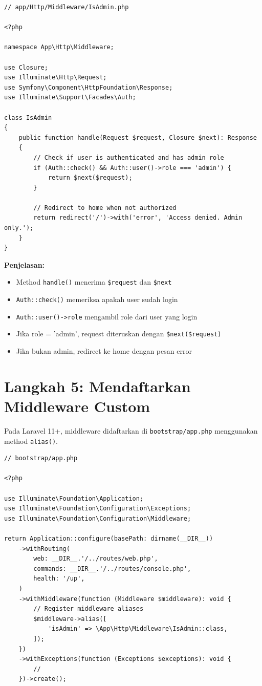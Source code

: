 \documentclass[a4paper,oneside,11pt]{book}
\begin{document}
\begin{lstlisting}[style=phpstyle]
// app/Http/Middleware/IsAdmin.php

<?php

namespace App\Http\Middleware;

use Closure;
use Illuminate\Http\Request;
use Symfony\Component\HttpFoundation\Response;
use Illuminate\Support\Facades\Auth;

class IsAdmin
{
    public function handle(Request $request, Closure $next): Response
    {
        // Check if user is authenticated and has admin role
        if (Auth::check() && Auth::user()->role === 'admin') {
            return $next($request);
        }

        // Redirect to home when not authorized
        return redirect('/')->with('error', 'Access denied. Admin only.');
    }
}
\end{lstlisting}

\textbf{Penjelasan:}
\begin{itemize}
    \item Method \texttt{handle()} menerima \texttt{\$request} dan \texttt{\$next}
    \item \texttt{Auth::check()} memeriksa apakah user sudah login
    \item \texttt{Auth::user()->role} mengambil role dari user yang login
    \item Jika role = 'admin', request diteruskan dengan \texttt{\$next(\$request)}
    \item Jika bukan admin, redirect ke home dengan pesan error
\end{itemize}

\section{Langkah 5: Mendaftarkan Middleware Custom}

Pada Laravel 11+, middleware didaftarkan di \texttt{bootstrap/app.php} menggunakan method \texttt{alias()}.

\begin{lstlisting}[style=phpstyle]
// bootstrap/app.php

<?php

use Illuminate\Foundation\Application;
use Illuminate\Foundation\Configuration\Exceptions;
use Illuminate\Foundation\Configuration\Middleware;

return Application::configure(basePath: dirname(__DIR__))
    ->withRouting(
        web: __DIR__.'/../routes/web.php',
        commands: __DIR__.'/../routes/console.php',
        health: '/up',
    )
    ->withMiddleware(function (Middleware $middleware): void {
        // Register middleware aliases
        $middleware->alias([
            'isAdmin' => \App\Http\Middleware\IsAdmin::class,
        ]);
    })
    ->withExceptions(function (Exceptions $exceptions): void {
        //
    })->create();
\end{lstlisting}
\end{document}

